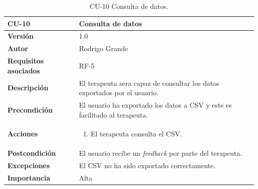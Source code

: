     \begin{table}[p]
	\centering
	\begin{tabularx}{\linewidth}{ p{} p{} }
		\toprule
		\textbf{CU-10} & \textbf{Consulta de datos}\\
		\toprule
		\textbf{Versión}              & 1.0    \\
		\textbf{Autor}                & Rodrigo Grande \\
		\textbf{Requisitos asociados} & RF-5 \\
		\textbf{Descripción}          & El terapeuta sera capaz de consultar los datos exportados por el usuario.\\
		\textbf{Precondición}         & El usuario ha exportado los datos a CSV y este es facilitado al terapeuta. \\
		\textbf{Acciones}             &
		\begin{enumerate}
			\def\labelenumi{\arabic{enumi}.}
			\tightlist
			\item El terapeuta consulta el CSV.
		\end{enumerate}\\
		\textbf{Postcondición}        & El usuario recibe un \textit{feedback} por parte del terapeuta. \\
		\textbf{Excepciones}          & El CSV no ha sido exportado correctamente. \\
		\textbf{Importancia}          & Alta \\
		\bottomrule
	\end{tabularx}
	\caption{CU-10 Consulta de datos.}
	\label{cu:consulta-de-datos}
\end{table}
